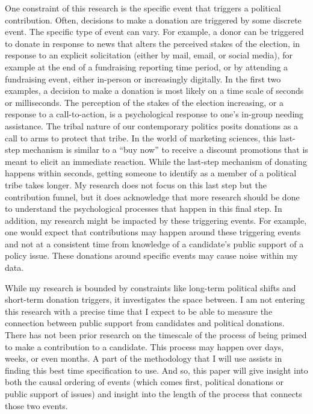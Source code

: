 \documentclass[12pt,]{article}
\begin{document}
One constraint of this research is the specific event that triggers a
political contribution. Often, decisions to make a donation are
triggered by some discrete event. The specific type of event can vary.
For example, a donor can be triggered to donate in response to news that
alters the perceived stakes of the election, in response to an explicit
solicitation (either by mail, email, or social media), for example at
the end of a fundraising reporting time period, or by attending a
fundraising event, either in-person or increasingly digitally. In the
first two examples, a decision to make a donation is most likely on a
time scale of seconds or milliseconds. The perception of the stakes of
the election increasing, or a response to a call-to-action, is a
psychological response to one's in-group needing assistance. The tribal
nature of our contemporary politics posits donations as a call to arms
to protect that tribe. In the world of marketing sciences, this
last-step mechanism is similar to a ``buy now'' to receive a discount
promotions that is meant to elicit an immediate reaction. While the
last-step mechanism of donating happens within seconds, getting someone
to identify as a member of a political tribe takes longer. My research
does not focus on this last step but the contribution funnel, but it
does acknowledge that more research should be done to understand the
psychological processes that happen in this final step. In addition, my
research might be impacted by these triggering events. For example, one
would expect that contributions may happen around these triggering
events and not at a consistent time from knowledge of a candidate's
public support of a policy issue. These donations around specific events
may cause noise within my data.

While my research is bounded by constraints like long-term political
shifts and short-term donation triggers, it investigates the space
between. I am not entering this research with a precise time that I
expect to be able to measure the connection between public support from
candidates and political donations. There has not been prior research on
the timescale of the process of being primed to make a contribution to a
candidate. This process may happen over days, weeks, or even months. A
part of the methodology that I will use assists in finding this best
time specification to use. And so, this paper will give insight into
both the causal ordering of events (which comes first, political
donations or public support of issues) and insight into the length of
the process that connects those two events.
\end{document}
